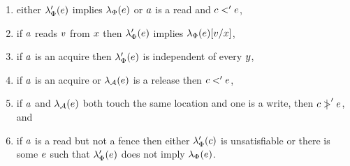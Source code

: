 \begin{definition}
\begin{enumerate}
\item either $\lambda_{\Phi}'(e)$ implies $\lambda_{\Phi}(e)$ or
  $a$ is a read and $c<'e$,
\item if $a$ reads $v$ from $x$ then
   $\lambda_{\Phi}'(e)$ implies $\lambda_{\Phi}(e)[v/x]$, %
\item if $a$ is an acquire then $\lambda_{\Phi}'(e)$ is independent of every $y$,
\item if $a$ is an acquire or $\lambda_{\mathcal{A}}(e)$ is a release then $c <' e$, 
\item if $a$ and $\lambda_{\mathcal{A}}(e)$ both touch the same location and one is a write,
    then $c \mathrel{\mkern4mu\mid\!\!\!>}' e$, and
\item if $a$ is a read but not a fence then either
  $\lambda_{\Phi}'(c)$ is unsatisfiable or there is some $e$ such
  that $\lambda_{\Phi}'(e)$ does not imply $\lambda_{\Phi}(e)$.

\end{enumerate}
\end{definition}
